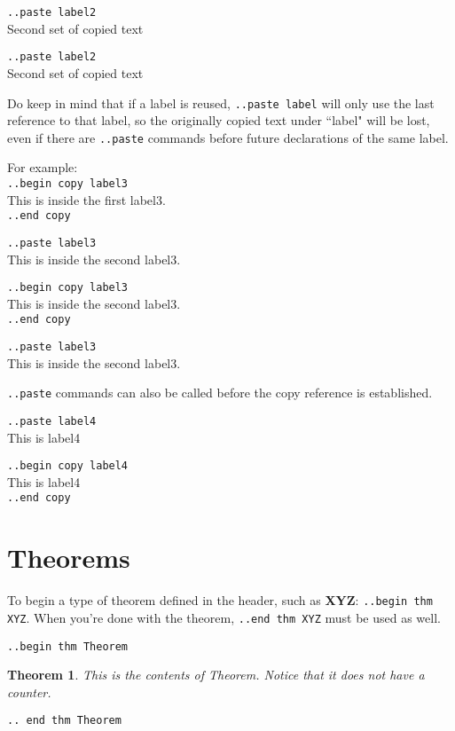 \documentclass[12pt]{article}
\newcommand{\nl}{\\}
\renewcommand\bold{\textbf}
\newtheorem*{Theorem}{Theorem}
\begin{document}
\begin{flushleft}
\bigskip

\verb|..paste label2| \nl
Second set of copied text \nl

\medskip

\verb|..paste label2| \nl
Second set of copied text \nl

\bigskip

Do keep in mind that if a label is reused, \verb|..paste label| will only use the last reference to that label, so the originally copied text under ``label" will be lost, even if there are \verb|..paste| commands before future declarations of the same label.

\bigskip

For example: \nl
\verb|..begin copy label3|\nl
This is inside the first label3. \nl
\verb|..end copy|

\bigskip

\verb|..paste label3| \nl
This is inside the second label3. \nl

\bigskip

\verb|..begin copy label3|\nl
This is inside the second label3. \nl
\verb|..end copy|

\bigskip

\verb|..paste label3| \nl
This is inside the second label3. \nl

\bigskip

\verb|..paste| commands can also be called before the copy reference is established.

\verb|..paste label4| \nl
This is label4 \nl

\bigskip

\verb|..begin copy label4| \nl
This is label4 \nl
\verb|..end copy|

\newpage

\section*{Theorems}

\bigskip

To begin a type of theorem defined in the header, such as \bold{XYZ}: \verb|..begin thm XYZ|. When you're done with the theorem, \verb|..end thm XYZ| must be used as well.

\medskip

\verb|..begin thm Theorem|
\begin{Theorem}
This is the contents of Theorem. Notice that it does not have a counter.
\end{Theorem}
\verb|.. end thm Theorem|


\end{flushleft}
\end{document}

